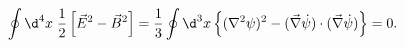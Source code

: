 \begin{equation}
\oint \d^4 x \; {1\over2} \left[ \vec E^2 - \vec B^2 \right] 
= 
{1\over3} \oint \d^3 x \left\{ 
(\nabla^2 \psi)^2
-
(\vec  \nabla\dot\psi)\cdot(\vec  \nabla\dot\psi) 
\right\} = 0.
\end{equation}

